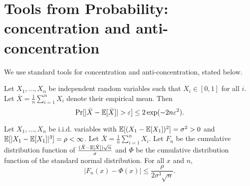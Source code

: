 \section{Tools from Probability: concentration and anti-concentration}
\label{sec:prelim}

We use standard tools for concentration and anti-concentration, stated below.

\begin{theorem}\label{thm:prelims-chernoff}
Let $X_1,...,X_n$  be independent random variables such that $X_i \in [0,1]$ for all $i$. Let $\bar{X} = \frac{1}{n}\sum_{i=1}^n X_i$ denote their empirical mean. Then
\[
\Pr[ |\bar{X} - \mathbb{E}[\bar{X}]| > \varepsilon] \leq 2\exp(-2n\varepsilon^2).
\]
\end{theorem}

\begin{theorem}\label{thm:prelims-Berry}
Let $X_1,...,X_n$ be i.i.d. variables with $\mathbb{E}[ (X_1 - \mathbb{E}[X_1])^2] = \sigma^2 >0$ and $\mathbb{E}[ |X_1 - \mathbb{E}[X_1]|^3] =\rho <\infty$. Let $\bar{X} = \frac{1}{n} \sum_{i=1}^n X_i$. Let $F_n$ be the cumulative distribution function of $\frac{(\bar{X} - \mathbb{E}[\bar{X}]) \sqrt{n}}{\sigma}$ and $\Phi$ be the cumulative distribution function of the standard normal distribution. For all $x$ and $n$,
\[
|F_n(x) - \Phi(x) | \leq \frac{\rho}{2\sigma^3\sqrt{n}}.
\]
\end{theorem}



